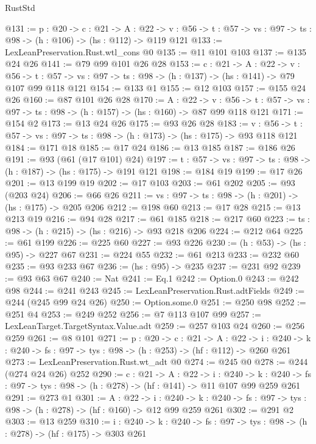 \begin{lexlean}{RustStd}
\begin{coremodule}
{\begin{coremodule}
{{{@131 := {p : @20} ->
  {c : @21} ->
  {A : @22} ->
  {v : @56} -> {t : @57} -> {vs : @97} -> {ts : @98} -> (h : @106) -> (hs : @112) -> @119 @121
@133 := LexLeanPreservation.Rust.wtl_cons @0
@135 := @11 @101 @103
@137 := @135 @24 @26
@141 := @79 @99 @101 @26 @28
@153 := {c : @21} ->
  {A : @22} ->
  {v : @56} ->
  {t : @57} -> {vs : @97} -> {ts : @98} -> (h : @137) -> (hs : @141) -> @79 @107 @99 @118 @121
@154 := @133 @1
@155 := @12 @103
@157 := @155 @24 @26
@160 := @87 @101 @26 @28
@170 := {A : @22} ->
  {v : @56} ->
  {t : @57} -> {vs : @97} -> {ts : @98} -> (h : @157) -> (hs : @160) -> @87 @99 @118 @121
@171 := @154 @2
@173 := @13 @24 @26
@175 := @93 @26 @28
@183 := {v : @56} ->
  {t : @57} -> {vs : @97} -> {ts : @98} -> (h : @173) -> (hs : @175) -> @93 @118 @121
@184 := @171 @18
@185 := @17 @24
@186 := @13 @185
@187 := @186 @26
@191 := @93 (@61 (@17 @101) @24)
@197 := {t : @57} -> {vs : @97} -> {ts : @98} -> (h : @187) -> (hs : @175) -> @191 @121
@198 := @184 @19
@199 := @17 @26
@201 := @13 @199 @19
@202 := @17 @103
@203 := @61 @202
@205 := @93 (@203 @24)
@206 := @66 @26
@211 := {vs : @97} -> {ts : @98} -> (h : @201) -> (hs : @175) -> @205 @206
@212 := @198 @60
@213 := @17 @28
@215 := @13 @213 @19
@216 := @94 @28
@217 := @61 @185
@218 := @217 @60
@223 := {ts : @98} -> (h : @215) -> (hs : @216) -> @93 @218 @206
@224 := @212 @64
@225 := @61 @199
@226 := @225 @60
@227 := @93 @226
@230 := (h : @53) -> (hs : @95) -> @227 @67
@231 := @224 @55
@232 := @61 @213
@233 := @232 @60
@235 := @93 @233 @67
@236 := (hs : @95) -> @235
@237 := @231 @92
@239 := @93 @63 @67
@240 := Nat
@241 := Eq.{1}
@242 := Option.{0}
@243 := @242 @98
@244 := @241 @243
@245 := LexLeanPreservation.Rust.adtFields
@249 := @244 (@245 @99 @24 @26)
@250 := Option.some.{0}
@251 := @250 @98
@252 := @251 @4
@253 := @249 @252
@256 := @7 @113 @107 @99
@257 := LexLeanTarget.TargetSyntax.Value.adt
@259 := @257 @103 @24
@260 := @256 @259
@261 := @8 @101
@271 := {p : @20} ->
  {c : @21} ->
  {A : @22} ->
  {i : @240} -> {k : @240} -> {fs : @97} -> {tys : @98} -> (h : @253) -> (hf : @112) -> @260 @261
@273 := LexLeanPreservation.Rust.wt_adt @0
@274 := @245 @0
@278 := @244 (@274 @24 @26) @252
@290 := {c : @21} ->
  {A : @22} ->
  {i : @240} ->
  {k : @240} -> {fs : @97} -> {tys : @98} -> (h : @278) -> (hf : @141) -> @11 @107 @99 @259 @261
@291 := @273 @1
@301 := {A : @22} ->
  {i : @240} ->
  {k : @240} -> {fs : @97} -> {tys : @98} -> (h : @278) -> (hf : @160) -> @12 @99 @259 @261
@302 := @291 @2
@303 := @13 @259
@310 := {i : @240} ->
  {k : @240} -> {fs : @97} -> {tys : @98} -> (h : @278) -> (hf : @175) -> @303 @261
}}}
\end{coremodule}}
\end{coremodule}
\end{lexlean}
